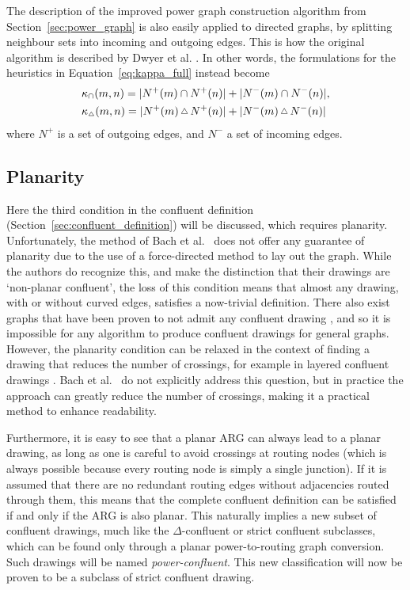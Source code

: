 The description of the improved power graph construction algorithm from Section~\ref{sec:power_graph} is also easily applied to directed graphs, by splitting neighbour sets into incoming and outgoing edges. This is how the original algorithm is described by Dwyer et al. \cite{Dwyer2014}.
In other words, the formulations for the heuristics in Equation~\eqref{eq:kappa_full} instead become
\begin{align}
  &\kappa_\cap(m,n) = |N^+(m)\cap N^+(n)| + |N^-(m)\cap N^-(n)|,\\
  &\kappa_{\Triangle}(m,n) = |N^+(m)\,\Triangle\,N^+(n)| + |N^-(m)\,\Triangle\,N^-(n)|
\end{align}
where $N^+$ is a set of outgoing edges, and $N^-$ a set of incoming edges.

\subsection{Planarity}
\label{sec:power_planarity}
Here the third condition in the confluent definition (Section~\ref{sec:confluent_definition}) will be discussed, which requires planarity. Unfortunately, the method of Bach et al.\ \cite{Bach2017} does not offer any guarantee of planarity due to the use of a force-directed method to lay out the graph.
While the authors do recognize this, and make the distinction that their drawings are `non-planar confluent', the loss of this condition means that almost any drawing, with or without curved edges, satisfies a now-trivial definition.
There also exist graphs that have been proven to not admit any confluent drawing \cite{Dickerson2005}, and so it is impossible for any algorithm to produce confluent drawings for general graphs.
However, the planarity condition can be relaxed in the context of finding a drawing that reduces the number of crossings, for example in layered confluent drawings \cite{Eppstein2007}. Bach et al.\ \cite{Bach2017} do not explicitly address this question, but in practice the approach can greatly reduce the number of crossings, making it a practical method to enhance readability.

Furthermore, it is easy to see that a planar ARG can always lead to a planar drawing, as long as one is careful to avoid crossings at routing nodes (which is always possible because every routing node is simply a single junction). If it is assumed that there are no redundant routing edges without adjacencies routed through them, this means that the complete confluent definition can be satisfied if and only if the ARG is also planar.
This naturally implies a new subset of confluent drawings, much like the $\Delta$-confluent \cite{Eppstein2005} or strict confluent \cite{Eppstein2013} subclasses, which can be found only through a planar power-to-routing graph conversion. Such drawings will be named \emph{power-confluent}.
This new classification will now be proven to be a subclass of strict confluent drawing. 

